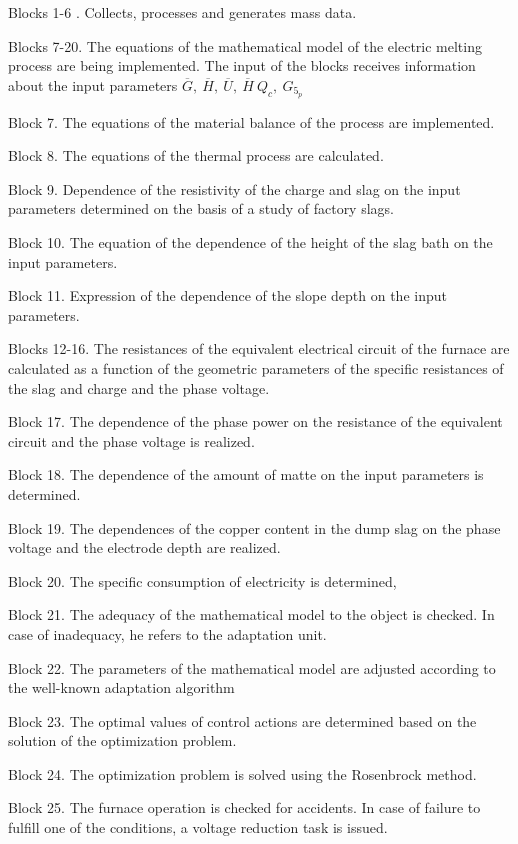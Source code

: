 \begin{noparindent}
Blocks 1-6 . Collects, processes and generates mass data.

Blocks 7-20. The equations of the mathematical model of the electric
melting process are being implemented. The input of the blocks receives
information about the input parameters
\(\overline{G},\ \overline{H},\ \overline{U},\ \overline{H}\ Q_{c},\ G_{5_{p}}\)

Block 7. The equations of the material balance of the process are
implemented.

Block 8. The equations of the thermal process are calculated.

Block 9. Dependence of the resistivity of the charge and slag on the
input parameters determined on the basis of a study of factory slags.

Block 10. The equation of the dependence of the height of the slag bath
on the input parameters.

Block 11. Expression of the dependence of the slope depth on the input
parameters.

Blocks 12-16. The resistances of the equivalent electrical circuit of
the furnace are calculated as a function of the geometric parameters of
the specific resistances of the slag and charge and the phase voltage.

Block 17. The dependence of the phase power on the resistance of the
equivalent circuit and the phase voltage is realized.

Block 18. The dependence of the amount of matte on the input parameters
is determined.

Block 19. The dependences of the copper content in the dump slag on the
phase voltage and the electrode depth are realized.

Block 20. The specific consumption of electricity is determined,

Block 21. The adequacy of the mathematical model to the object is
checked. In case of inadequacy, he refers to the adaptation unit.

Block 22. The parameters of the mathematical model are adjusted
according to the well-known adaptation algorithm

Block 23. The optimal values of control actions are determined based on
the solution of the optimization problem.

Block 24. The optimization problem is solved using the Rosenbrock
method.

Block 25. The furnace operation is checked for accidents. In case of
failure to fulfill one of the conditions, a voltage reduction task is
issued.


\end{noparindent}
